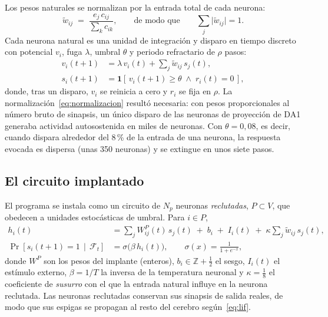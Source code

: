 \documentclass[11pt,a4paper]{article}
\theoremstyle{plain}
\theoremstyle{definition}
\theoremstyle{remark}
\newcommand{\sig}{\sigma}
\newcommand{\ind}{\mathbf{1}}
\newcommand{\Z}{\mathbb{Z}}
\begin{document}
Los pesos naturales se normalizan por la entrada total de cada neurona:
\begin{equation}
  \tilde w_{ij} \;=\; \frac{e_j\, c_{ij}}{\sum_k c_{ik}},
  \qquad\text{de modo que}\qquad \sum_j \lvert \tilde w_{ij}\rvert = 1 .
  \label{eq:normalizacion}
\end{equation}
Cada neurona natural es una unidad de integración y disparo en tiempo discreto
con potencial $v_i$, fuga $\lambda$, umbral $\theta$ y periodo refractario de
$\rho$ pasos:
\begin{align}
  v_i(t+1) &= \lambda\, v_i(t) + \sum_j \tilde w_{ij}\, s_j(t),
  \label{eq:lif}\\
  s_i(t+1) &= \ind\!\left[\, v_i(t+1)\ge\theta \;\wedge\; r_i(t)=0 \,\right],
  \label{eq:disparo-natural}
\end{align}
donde, tras un disparo, $v_i$ se reinicia a cero y $r_i$ se fija en $\rho$.
La normalización~\eqref{eq:normalizacion} resultó necesaria: con pesos
proporcionales al número bruto de sinapsis, un único disparo de las neuronas
de proyección de DA1 generaba actividad autosostenida en miles de neuronas.
Con $\theta = 0{,}08$, es decir, cuando dispara alrededor del 8\,\% de la
entrada de una neurona, la respuesta evocada es dispersa (unas 350 neuronas)
y se extingue en unos siete pasos.

\subsection{El circuito implantado}

El programa se instala como un circuito de $N_p$ neuronas \emph{reclutadas},
$P\subset V$, que obedecen a unidades estocásticas de umbral. Para $i\in P$,
\begin{align}
  h_i(t) &= \sum_{j} W^{P}_{ij}(t)\, s_j(t) \;+\; b_i \;+\; I_i(t)
            \;+\; \kappa \sum_j \tilde w_{ij}\, s_j(t),
  \label{eq:potencial-implante}\\
  \Pr\!\left[s_i(t+1)=1 \,\middle|\, \mathcal F_t\right] &= \sig\!\big(\beta\, h_i(t)\big),
  \qquad \sig(x) = \frac{1}{1+e^{-x}},
  \label{eq:disparo-implante}
\end{align}
donde $W^P$ son los pesos del implante (enteros), $b_i\in\Z+\tfrac12$ el
sesgo, $I_i(t)$ el estímulo externo, $\beta=1/T$ la inversa de la temperatura
neuronal y $\kappa=\tfrac18$ el coeficiente de \emph{susurro} con el que la
entrada natural influye en la neurona reclutada. Las neuronas reclutadas
conservan sus sinapsis de salida reales, de modo que sus espigas se propagan
al resto del cerebro según~\eqref{eq:lif}.
\end{document}
